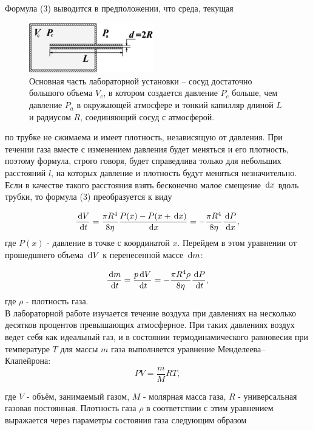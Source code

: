 \documentclass[a4paper]{article}
\begin{document}
Формула (3) выводится в предположении, что среда, текущая
\begin{figure}[H]
    \begin{center}
    \includegraphics[width=0.48\textwidth]{pick_3}
    \caption{Основная часть лабораторной установки – сосуд достаточно
большого объема $V_c$, в котором создается давление $P_c$ больше, чем
давление $P_a$ в окружающей атмосфере и тонкий капилляр длиной $L$ и
радиусом $R$, соединяющий сосуд с атмосферой.}
\end{center}
\end{figure}

по трубке не сжимаема и имеет плотность, независящую от давления. При течении газа вместе с изменением давления будет
меняться и его плотность, поэтому формула, строго говоря, будет справедлива только для небольших расстояний $l$, на которых
давление и плотность будут меняться незначительно. Если в качестве такого расстояния взять бесконечно малое смещение $\dl x$ 
вдоль трубки, то формула (3) преобразуется к виду

\begin{equation}
\dfrac{\dl V}{\dl t} = \dfrac{\pi R^4}{8\eta}\dfrac{P(x) - P(x+\dl x)}{\dl x} = -\dfrac{\pi R^4}{8\eta}\dfrac{\dl P}{\dl x},
\end{equation}
где $P(x)$ - давление в точке с координатой $x$. Перейдем в этом
уравнении от прошедшнего объема $\dl V$ к перенесенной массе $\dl m$:

\begin{equation}
    \dfrac{\dl m}{\dl t} = \dfrac{p\dl V}{\dl t} = -\dfrac{\pi R^4\rho}{8 \eta} \dfrac{\dl P}{\dl t},
\end{equation}
где $\rho$ - плотность газа.\\
В лабораторной работе изучается течение воздуха при давлениях на несколько десятков процентов превышающих атмосферное. При таких давлениях воздух ведет себя как идеальный
газ, и в состоянии термодинамического равновесия при температуре $T$ для массы $m$ газа выполняется уравнение Менделеева–Клапейрона:
\begin{equation}
    PV = \dfrac{m}{M}RT,
\end{equation}

где $V$ - объём, занимаемый газом, $M$ - молярная масса газа, $R$
- универсальная газовая постоянная. Плотность газа $\rho$ в соответствии с этим уравнением выражается через параметры состояния газа следующим образом
\end{document}
